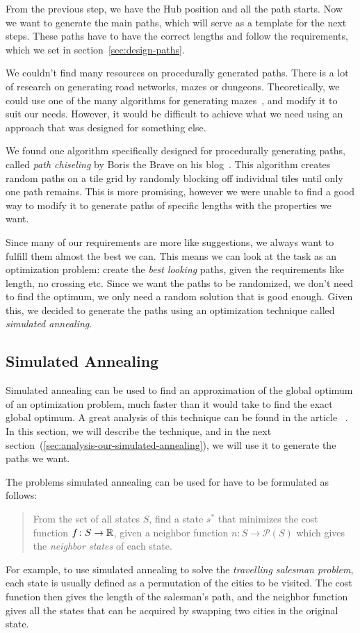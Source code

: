From the previous step, we have the Hub position and all the path starts.
Now we want to generate the main paths, which will serve as a template for the next steps.
These paths have to have the correct lengths and follow the requirements, which we set in section~\ref{sec:design-paths}.

We couldn't find many resources on procedurally generated paths.
There is a lot of research on generating road networks, mazes or dungeons.
Theoretically, we could use one of the many algorithms for generating mazes~\cite{MazeWiki}, and modify it to suit our needs.
However, it would be difficult to achieve what we need using an approach that was designed for something else.

We found one algorithm specifically designed for procedurally generating paths, called \emph{path chiseling} by Boris the Brave on his blog~\cite{PathChiseling1}\cite{PathChiseling2}.
This algorithm creates random paths on a tile grid by randomly blocking off individual tiles until only one path remains.
This is more promising, however we were unable to find a good way to modify it to generate paths of specific lengths with the properties we want.

Since many of our requirements are more like suggestions, we always want to fulfill them almost the best we can.
This means we can look at the task as an optimization problem: create the \emph{best looking} paths, given the requirements like length, no crossing etc.
Since we want the paths to be randomized, we don't need to find the optimum, we only need a random solution that is good enough.
Given this, we decided to generate the paths using an optimization technique called \emph{simulated annealing}.

\subsection{Simulated Annealing}\label{sec:analysis-simulated-annealing}

Simulated annealing can be used to find an approximation of the global optimum of an optimization problem, much faster than it would take to find the exact global optimum.
A great analysis of this technique can be found in the article ~\cite{SimulatedAnnealing}.
In this section, we will describe the technique, and in the next section~(\ref{sec:analysis-our-simulated-annealing}), we will use it to generate the paths we want.

The problems simulated annealing can be used for have to be formulated as follows:
\begin{quotation}
    From the set of all states $S$, find a state $s^*$ that minimizes the cost function $f \colon S \to \mathbb{R}$, given a neighbor function $n \colon S \to \mathcal{P}(S)$ which gives the \emph{neighbor states} of each state.
\end{quotation}
For example, to use simulated annealing to solve the \emph{travelling salesman problem}, each state is usually defined as a permutation of the cities to be visited.
The cost function then gives the length of the salesman's path, and the neighbor function gives all the states that can be acquired by swapping two cities in the original state.

